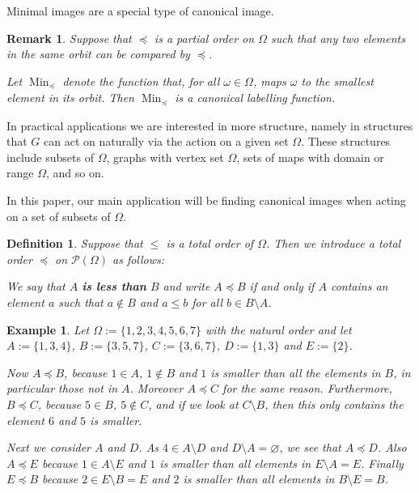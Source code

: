\documentclass[preprint,12pt]{elsarticle}
\newtheorem{rem}[theorem]{Remark}
\newtheorem{defi}[theorem]{Definition}
\newtheorem{ex}[theorem]{Example}
\newcommand{\Min}{\operatorname{Min}}
\newcommand{\powset}{\mathcal{P}}
\begin{document}
Minimal images are a special type of canonical image.

\begin{rem}
  Suppose that $\preccurlyeq$ is a partial order on $\Omega$ such that any
  two elements in the same orbit can be compared by $\preccurlyeq$.

   Let $\Min_\preccurlyeq$ denote the function that, for all $\omega \in \Omega$, maps $\omega$ to the
  smallest element in its orbit. Then $\Min_\preccurlyeq$ is a canonical labelling function.
\end{rem}

In practical applications we are interested in more structure, namely in structures
that $G$ can act on naturally via the action on a given set $\Omega$. These
structures include subsets of $\Omega$, graphs with vertex set $\Omega$, sets of
maps with domain or range $\Omega$, and so on.


In this paper, our main application will be finding canonical images when
acting on a set of subsets of $\Omega$.

\begin{defi}\label{metaorder}
  Suppose that $\leq$ is a total order of $\Omega$.
  Then we introduce a total order $\preccurlyeq$ on $\powset(\Omega)$ as follows:

  We say that $A$ \textbf{is less than} $B$ and write $A \preccurlyeq B$ if and only if $A$
  contains an element $a$ such that $a \notin B$ and $a \leq b$ for all
  $b \in B \setminus A$.
\end{defi}

\begin{ex}
  Let $\Omega:=\{1,2,3,4,5,6,7\}$ with the natural order and let $A:=\{1,3,4\}$,
  $B:=\{3,5,7\}$, $C:=\{3,6,7\}$, $D:=\{1,3\}$ and $E:=\{2\}$.

  Now $A \preccurlyeq B$, because $1 \in A$, $1 \notin B$ and $1$ is smaller
  than all the elements in $B$, in particular those not in $A$. Moreover $A \preccurlyeq C$ for the same reason. Furthermore, $B \preccurlyeq C$,
  because $5 \in B$, $5 \notin C$, and if we look at $C \setminus B$, then
  this only contains the element $6$ and $5$ is smaller.

  Next we consider $A$ and $D$. As $4 \in A \setminus D$ and $D\setminus A=\varnothing$, we see that $A \preccurlyeq D$. Also $A \preccurlyeq E$ because $1 \in A \setminus E$ and $1$ is smaller than all elements in $E \setminus A=E$.
  Finally $E \preccurlyeq B$ because $2 \in E \setminus B=E$ and $2$ is smaller than all elements in $B \setminus E=B$.
\end{ex}
\end{document}
